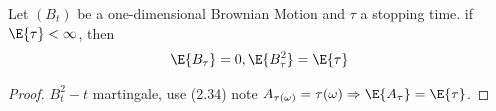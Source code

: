 \begin{cor}
Let $(B_t)$ be a one-dimensional Brownian Motion and $\tau$ a stopping time.
if $\E{\tau}<\infty$, then
\begin{align*}
\E{B_\tau}=0, \E{B_\tau^2}=\E{\tau}
\end{align*}
\end{cor}
\begin{proof}
$B_t^2-t$ martingale, use (2.34)
note $A_{\tau(\omega)}=\tau(\omega) \Rightarrow \E{A_\tau}=\E{\tau}$.
\end{proof}